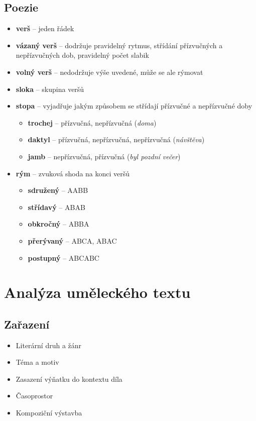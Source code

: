\subsection{Poezie}
\begin{itemize}
\item[] \textbf{verš} -- jeden řádek
\item[] \textbf{vázaný verš} -- dodržuje pravidelný rytmus, střídání přízvučných a nepřízvučných dob, pravidelný počet slabik
\item[] \textbf{volný verš} -- nedodržuje výše uvedené, může se ale rýmovat
\item[] \textbf{sloka} -- skupina veršů
\item[] \textbf{stopa} -- vyjadřuje jakým způsobem se střídají přízvučné a nepřízvučné doby
\begin{itemize}
\item \textbf{trochej} -- přízvučná, nepřízvučná (\textit{doma})
\item \textbf{daktyl} -- přízvučná, nepřízvučná, nepřízvučná (\textit{návštěva})
\item \textbf{jamb} -- nepřízvučná, přízvučná (\textit{byl pozdní večer})
\end{itemize}
\item[] \textbf{rým} -- zvuková shoda na konci veršů
\begin{itemize}
\item \textbf{sdružený} -- AABB
\item \textbf{střídavý} -- ABAB
\item \textbf{obkročný} -- ABBA
\item \textbf{přerývaný} -- ABCA, ABAC
\item \textbf{postupný} -- ABCABC

\end{itemize}
\end{itemize}

\newpage
\section{Analýza uměleckého textu}
\subsection{Zařazení}
\begin{itemize}
\item Literární druh a žánr
\item Téma a motiv
\item Zasazení výňatku do kontextu díla
\item Časoprostor
\item Kompoziční výstavba
\end{itemize}
